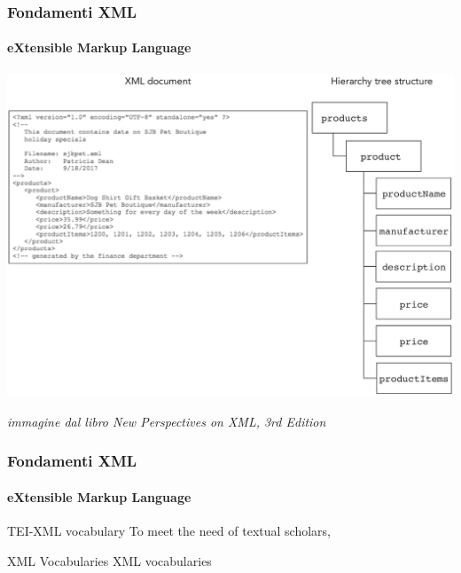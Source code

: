 \begin{frame}
	\frametitle{Fondamenti XML}
	\framesubtitle{eXtensible Markup Language}
	\addtocounter{nframe}{1}

	\begin{center}
		\includegraphics[width=.9\textwidth]{imgs/XML-TreeStructure.png}
	\end{center}

\begin{tiny}\textit{immagine dal libro New Perspectives on XML, 3rd Edition}\end{tiny}

\end{frame}

\begin{frame}
	\frametitle{Fondamenti XML}
	\framesubtitle{eXtensible Markup Language}
	\addtocounter{nframe}{1}

	\begin{block}{TEI-XML vocabulary}
		To meet the need of textual scholars,%
	\end{block}

	\begin{block}{XML Vocabularies}
		XML vocabularies%
	\end{block}

\end{frame}


